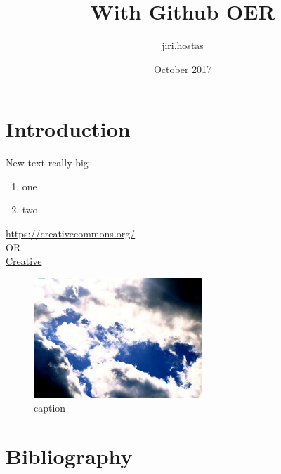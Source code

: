 \documentclass[14pt]{article}
\title{With Github OER}
\author{jiri.hostas }
\date{October 2017}
\begin{document}
\maketitle

\section{Introduction}
New text really big\cite{Mardirossian2016}

\begin{enumerate}
    \item one
    \item two
\end{enumerate}
\url{https://creativecommons.org/} \\
OR \\

\href{http://creativecommons.org/}{Creative}

\begin{figure}[h]
    \centering
    \includegraphics[width=\textwidth]{image1.jpg}
    \caption{caption}
\end{figure}
\section{Bibliography}

\end{document}
